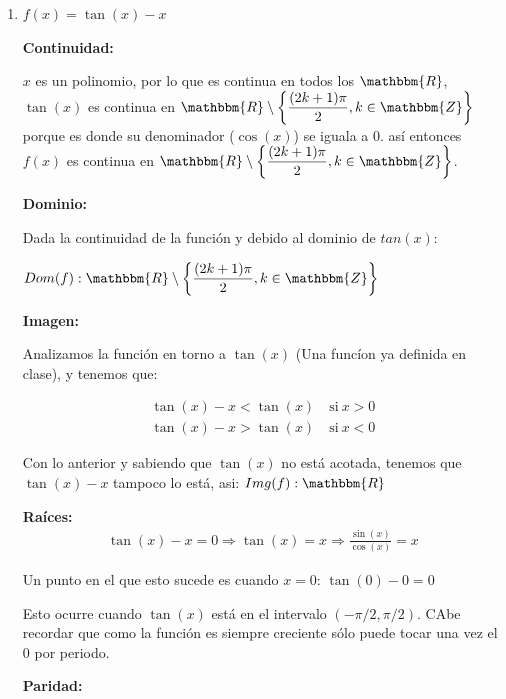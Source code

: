 \documentclass[12pt]{article}
\begin{document}
\begin{enumerate}[\hspace{9px} a)]
    \item \(f(x)=\tan(x)-x\)\bigskip
    
        \textbf{Continuidad: }\medskip

            $x$ es un polinomio, por lo que es continua en todos los $\mathbbm{R}$, \(\tan(x)\) es continua en \(\mathbbm{R}\setminus\displaystyle\left\{\frac{(2k+1)\pi}{2}, k\in\mathbbm{Z}\right\}\) porque es donde su denominador (\(\cos(x)\)) se iguala a 0. as\'i entonces \(f(x)\) es continua en \(\mathbbm{R}\setminus\displaystyle\left\{\frac{(2k+1)\pi}{2}, k\in\mathbbm{Z}\right\}\).\bigskip
        
        \textbf{Dominio: }\medskip
            
            Dada la continuidad de la funci\'on y debido al dominio de \(tan(x)\):\medskip

            \(Dom(f):\mathbbm{R}\setminus\displaystyle\left\{\frac{(2k+1)\pi}{2}, k\in\mathbbm{Z}\right\}\)\bigskip

        \textbf{Imagen: }\medskip

            Analizamos la funci\'on en torno a $\tan(x)$ (Una func\'ion ya definida en clase), y tenemos que:

            \begin{align*}
                \tan(x)-x<\tan(x) \quad \text{si} \ x>0\\
                \tan(x)-x>\tan(x) \quad \text{si} \ x<0
            \end{align*}

            Con lo anterior y sabiendo que \(\tan(x)\) no est\'a acotada, tenemos que \(\tan(x)-x\) tampoco lo est\'a, asi: \(Img(f): \mathbbm{R}\)\bigskip

        \textbf{Ra\'ices: }\medskip
            \begin{align*}
                \tan(x)-x=0 \Rightarrow \tan(x)=x \Rightarrow \frac{\sin(x)}{\cos(x)}=x
            \end{align*}

            Un punto en el que esto sucede es cuando \(x=0\): \(\tan(0)-0=0\)

            Esto ocurre cuando $\tan(x)$ est\'a en el intervalo \((-\pi/2,\pi/2)\). CAbe recordar que como la funci\'on es siempre creciente s\'olo puede tocar una vez el 0 por periodo.

        \textbf{Paridad: }\medskip


\end{enumerate}
\end{document}
